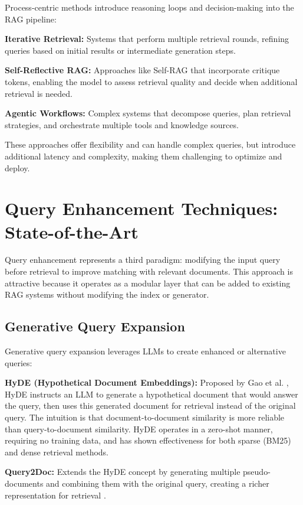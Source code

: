 Process-centric methods introduce reasoning loops and decision-making into the RAG pipeline:

\textbf{Iterative Retrieval:} Systems that perform multiple retrieval rounds, refining queries based on initial results or intermediate generation steps.

\textbf{Self-Reflective RAG:} Approaches like Self-RAG \cite{asai_2024_selfrag} that incorporate critique tokens, enabling the model to assess retrieval quality and decide when additional retrieval is needed.

\textbf{Agentic Workflows:} Complex systems that decompose queries, plan retrieval strategies, and orchestrate multiple tools and knowledge sources.

These approaches offer flexibility and can handle complex queries, but introduce additional latency and complexity, making them challenging to optimize and deploy.

\section{Query Enhancement Techniques: State-of-the-Art}

Query enhancement represents a third paradigm: modifying the input query before retrieval to improve matching with relevant documents. This approach is attractive because it operates as a modular layer that can be added to existing RAG systems without modifying the index or generator.

\subsection{Generative Query Expansion}

Generative query expansion leverages LLMs to create enhanced or alternative queries:

\textbf{HyDE (Hypothetical Document Embeddings):} Proposed by Gao et al. \cite{gao_2022_precise}, HyDE instructs an LLM to generate a hypothetical document that would answer the query, then uses this generated document for retrieval instead of the original query. The intuition is that document-to-document similarity is more reliable than query-to-document similarity. HyDE operates in a zero-shot manner, requiring no training data, and has shown effectiveness for both sparse (BM25) and dense retrieval methods.

\textbf{Query2Doc:} Extends the HyDE concept by generating multiple pseudo-documents and combining them with the original query, creating a richer representation for retrieval \cite{wang_2023_query2doc}.

